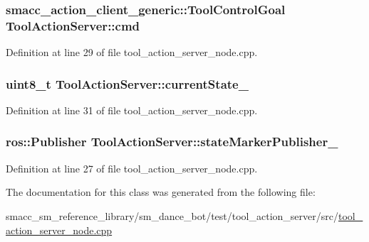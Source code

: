 \subsubsection[{\texorpdfstring{cmd}{cmd}}]{\setlength{\rightskip}{0pt plus 5cm}smacc\+\_\+action\+\_\+client\+\_\+generic\+::\+Tool\+Control\+Goal Tool\+Action\+Server\+::cmd}\hypertarget{classToolActionServer_ad2320c18b9cf85de44f77e9815368902}{}\label{classToolActionServer_ad2320c18b9cf85de44f77e9815368902}


Definition at line 29 of file tool\+\_\+action\+\_\+server\+\_\+node.\+cpp.

\subsubsection[{\texorpdfstring{current\+State\+\_\+}{currentState_}}]{\setlength{\rightskip}{0pt plus 5cm}uint8\+\_\+t Tool\+Action\+Server\+::current\+State\+\_\+}\hypertarget{classToolActionServer_aac4862d8c313b07e8506eb0c74507fb1}{}\label{classToolActionServer_aac4862d8c313b07e8506eb0c74507fb1}


Definition at line 31 of file tool\+\_\+action\+\_\+server\+\_\+node.\+cpp.

\subsubsection[{\texorpdfstring{state\+Marker\+Publisher\+\_\+}{stateMarkerPublisher_}}]{\setlength{\rightskip}{0pt plus 5cm}ros\+::\+Publisher Tool\+Action\+Server\+::state\+Marker\+Publisher\+\_\+}\hypertarget{classToolActionServer_a1b3cb5d19e61b0207ef3f8fd99fc196d}{}\label{classToolActionServer_a1b3cb5d19e61b0207ef3f8fd99fc196d}


Definition at line 27 of file tool\+\_\+action\+\_\+server\+\_\+node.\+cpp.



The documentation for this class was generated from the following file\+:\begin{DoxyCompactItemize}
\item 
smacc\+\_\+sm\+\_\+reference\+\_\+library/sm\+\_\+dance\+\_\+bot/test/tool\+\_\+action\+\_\+server/src/\hyperlink{tool__action__server__node_8cpp}{tool\+\_\+action\+\_\+server\+\_\+node.\+cpp}\end{DoxyCompactItemize}
